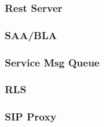 \documentclass[letterpaper,10pt,english]{sphinxmanual}
\begin{document}
\subsubsection{Rest Server}
\label{\detokenize{webui:rest-server}}\label{\detokenize{webui:id42}}\begin{quote}

\end{quote}


\subsubsection{SAA/BLA}
\label{\detokenize{webui:saa-bla}}\label{\detokenize{webui:shared-appearance-agent}}\begin{quote}

\end{quote}


\subsubsection{Service Msg Queue}
\label{\detokenize{webui:service-msg-queue}}\label{\detokenize{webui:message-queue}}\begin{quote}

\end{quote}


\subsubsection{RLS}
\label{\detokenize{webui:rls}}\label{\detokenize{webui:resource-list-server}}\begin{quote}

\end{quote}


\subsubsection{SIP Proxy}
\label{\detokenize{webui:sip-proxy}}\label{\detokenize{webui:id43}}\begin{quote}

\end{quote}
\end{document}

